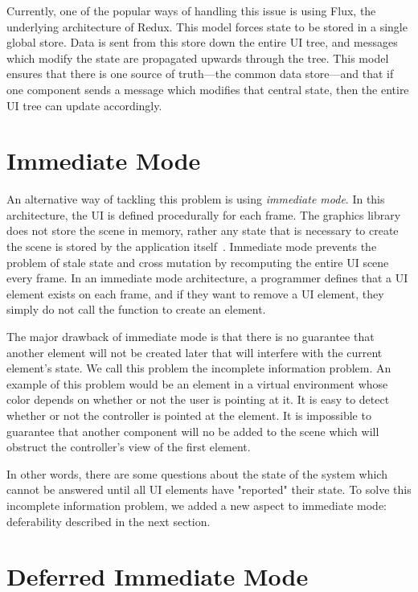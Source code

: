 \documentclass[conference,12pt]{IEEEtran}
\begin{document}
Currently, one of the popular ways of handling this issue is using Flux, the
underlying architecture of Redux. This model forces state to be stored in a
single global store. Data is sent from this store down the entire UI tree, and
messages which modify the state are propagated upwards through the tree. This
model ensures that there is one source of truth---the common data store---and
that if one component sends a message which modifies that central state, then
the entire UI tree can update accordingly.

\section{Immediate Mode}\label{sec:immediate-mode}

An alternative way of tackling this problem is using \textit{immediate mode}.
In this architecture, the UI is defined procedurally for each frame. The
graphics library does not store the scene in memory, rather any state that is
necessary to create the scene is stored by the application
itself~\cite{Microsoft:Retained-vs-Immediate}. Immediate mode prevents the
problem of stale state and cross mutation by recomputing the entire UI scene
every frame. In an immediate mode architecture, a programmer defines that a UI
element exists on each frame, and if they want to remove a UI element, they
simply do not call the function to create an element.

The major drawback of immediate mode is that there is no guarantee that another
element will not be created later that will interfere with the current element's
state. We call this problem the incomplete information problem. An example of
this problem would be an element in a virtual environment whose color depends on
whether or not the user is pointing at it. It is easy to detect whether or not
the controller is pointed at the element. It is impossible to guarantee that
another component will no be added to the scene which will obstruct the
controller's view of the first element.

In other words, there are some questions about the state of the system which
cannot be answered until all UI elements have "reported" their state.  To solve
this incomplete information problem, we added a new aspect to immediate mode:
deferability described in the next section.

\section{Deferred Immediate Mode}\label{sec:dim}
\end{document}
